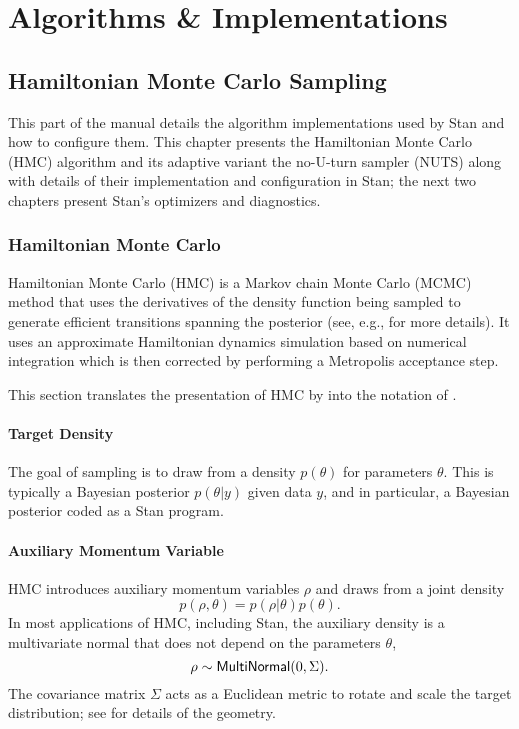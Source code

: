 \part{Algorithms \& Implementations}

\chapter{Hamiltonian Monte Carlo Sampling}\label{hmc.chapter}

\noindent
This part of the manual details the algorithm implementations used by
Stan and how to configure them. This chapter presents the Hamiltonian
Monte Carlo (HMC) algorithm and its adaptive variant the no-U-turn
sampler (NUTS) along with details of their implementation and
configuration in Stan; the next two chapters present Stan's optimizers
and diagnostics.


\section{Hamiltonian Monte Carlo}

Hamiltonian Monte Carlo (HMC) is a Markov chain Monte Carlo (MCMC)
method that uses the derivatives of the density function being sampled
to generate efficient transitions spanning the posterior (see, e.g.,
\citep{Betancourt-Girolami:2013,Neal:2011} for more details). It uses
an approximate Hamiltonian dynamics simulation based on numerical
integration which is then corrected by performing a
Metropolis acceptance step.

This section translates the presentation of HMC by
\cite{Betancourt-Girolami:2013} into the notation of
\cite{GelmanEtAl:2013}.

\subsection{Target Density}

The goal of sampling is to draw from a density $p(\theta)$ for
parameters $\theta$.  This is typically a Bayesian posterior
$p(\theta|y)$ given data $y$, and in particular, a Bayesian posterior
coded as a Stan program.



\subsection{Auxiliary Momentum Variable}

HMC introduces auxiliary momentum variables $\rho$ and draws from a
joint density
%
\[
p(\rho,\theta) = p(\rho|\theta) p(\theta).
\]
%
In most applications of HMC, including Stan, the auxiliary density is
a multivariate normal that does not depend on the parameters $\theta$,
\[
\rho \sim \distro{MultiNormal}(0, \Sigma).
\]
The covariance matrix $\Sigma$ acts as a Euclidean metric to rotate
and scale the target distribution; see \citep{Betancourt-Stein:2011}
for details of the geometry.

